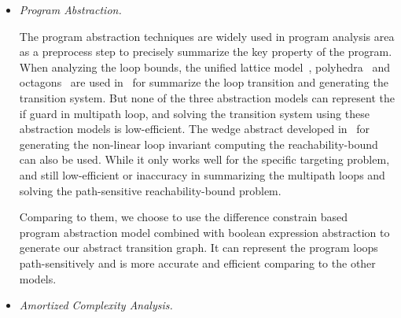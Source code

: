 \begin{itemize}
\item \emph{Program Abstraction.}

The program abstraction techniques are widely used in program analysis area as a preprocess step to precisely summarize the key property of the program. 
When analyzing the loop bounds, the unified lattice model~\cite{CousotH78}, polyhedra~\cite{CousotC77} and octagons~\cite{Mine06} are used in~\cite{GulwaniZ10} for summarize the loop transition and generating the transition system.
But none of the three abstraction models can represent the if guard in multipath loop, and solving the transition system using these abstraction models is low-efficient.
The wedge abstract developed in~\cite{KincaidCBR18} for generating the non-linear loop invariant
computing the reachability-bound can also be used. While it only works well for the specific targeting problem, and still low-efficient or inaccuracy in summarizing the multipath loops and solving the path-sensitive reachability-bound problem.

Comparing to them, we choose to use the difference constrain based~\cite{SinnZV17,SinnZV14} program abstraction model combined with boolean expression abstraction to generate our abstract transition graph. It can represent the program loops path-sensitively and is more accurate and efficient comparing to the other models. 

\item \emph{Amortized Complexity Analysis.}


\end{itemize}
